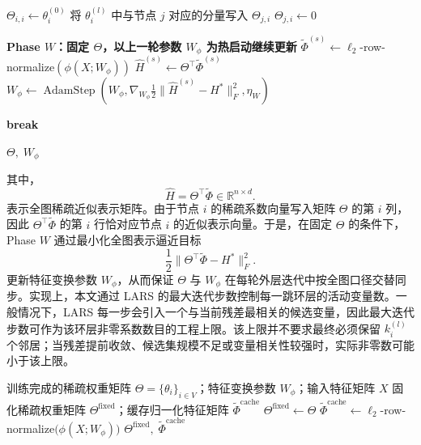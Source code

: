 \begin{algorithm}[tp]
\begin{algorithmic}[1]
    \STATE $\Theta_{i,i}\leftarrow \theta_i^{(0)}$
        \STATE 将 $\theta_i^{(l)}$ 中与节点 $j$ 对应的分量写入 $\Theta_{j,i}$
      \ENDFOR
    \ENDFOR
      \STATE $\Theta_{j,i}\leftarrow 0$
    \ENDFOR
  \ENDFOR

  \STATE \textbf{Phase $W$：固定 $\Theta$，以上一轮参数 $W_\phi$ 为热启动继续更新}
    \STATE $\tilde{\Phi}^{(s)}\leftarrow \ell_2$-row-normalize$(\phi(X;W_\phi))$
    \STATE $\hat{H}^{(s)}\leftarrow \Theta^\top\tilde{\Phi}^{(s)}$
    \STATE $W_\phi\leftarrow \operatorname{AdamStep}\!\left(W_\phi,\nabla_{W_\phi}\frac{1}{2}\|\hat{H}^{(s)}-H^*\|_F^2,\eta_W\right)$
  \ENDFOR

    \STATE \textbf{break} 
  \ENDIF
\ENDFOR

\RETURN $\Theta,\;W_\phi$
\end{algorithmic}
\end{algorithm}

其中，
\begin{equation}
  \hat{H}=\Theta^\top\tilde{\Phi}\in\mathbb{R}^{n\times d}.
  \label{eq:ch5-hhat-matrix}
\end{equation}
表示全图稀疏近似表示矩阵。由于节点 $i$ 的稀疏系数向量写入矩阵 $\Theta$ 的第 $i$ 列，因此 $\Theta^\top\tilde{\Phi}$ 的第 $i$ 行恰对应节点 $i$ 的近似表示向量。于是，在固定 $\Theta$ 的条件下，Phase $W$ 通过最小化全图表示逼近目标
\begin{equation}
  \frac{1}{2}\|\Theta^\top\tilde{\Phi}-H^*\|_F^2.
  \label{eq:ch5-phaseW-objective}
\end{equation}
更新特征变换参数 $W_\phi$，从而保证 $\Theta$ 与 $W_\phi$ 在每轮外层迭代中按全图口径交替同步。实现上，本文通过 LARS 的最大迭代步数控制每一跳环层的活动变量数。一般情况下，LARS 每一步会引入一个与当前残差最相关的候选变量，因此最大迭代步数可作为该环层非零系数数目的工程上限。该上限并不要求最终必须保留 \(k_i^{(l)}\) 个邻居；当残差提前收敛、候选集规模不足或变量相关性较强时，实际非零数可能小于该上限。

\begin{algorithm}[htbp]
\caption{推理期稀疏固化}
\label{alg:ch5-fixed}
\begin{algorithmic}[1]
\setlength{\algorithmicindent}{2em}
\REQUIRE 训练完成的稀疏权重矩阵 $\Theta=\{\theta_i\}_{i\in V}$；特征变换参数 $W_\phi$；输入特征矩阵 $X$
\ENSURE 固化稀疏权重矩阵 $\Theta^{\text{fixed}}$；缓存归一化特征矩阵 $\tilde{\Phi}^{\text{cache}}$
\STATE $\Theta^{\text{fixed}}\leftarrow \Theta$
\STATE $\tilde{\Phi}^{\text{cache}}\leftarrow \ell_2$-row-normalize$\bigl(\phi(X;W_\phi)\bigr)$
\RETURN $\Theta^{\text{fixed}},\;\tilde{\Phi}^{\text{cache}}$
\end{algorithmic}
\end{algorithm}

